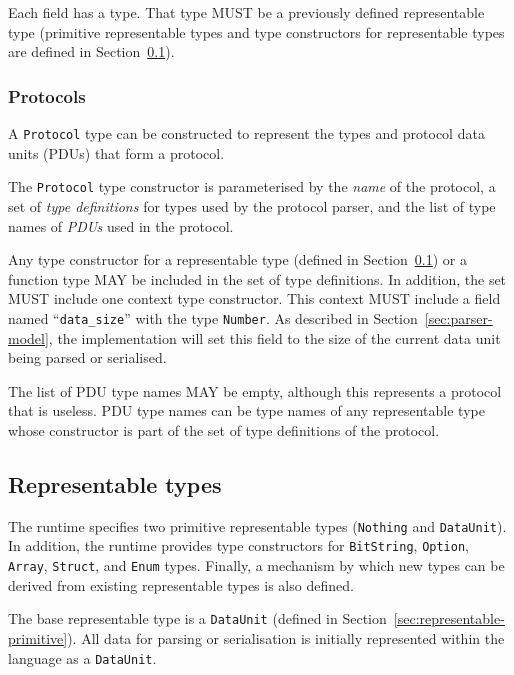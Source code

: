 \documentclass[10pt,twocolumn,a4paper]{article}
\newcommand{\code}[1]{\texttt{#1}}
\begin{document}
Each field has a type. That type MUST be a previously defined representable
type (primitive representable types and type constructors for representable
types are defined in Section~\ref{sec:representable}).

\subsubsection{Protocols}
\label{sec:protocol}

A \code{Protocol} type can be constructed to represent
the types and protocol data units (PDUs) that form a protocol.

The \code{Protocol} type constructor is parameterised by the \emph{name} of the
protocol, a set of \emph{type definitions} for types used by the protocol parser,
and the list of type names of \emph{PDUs} used in the protocol.

Any type constructor for a representable type (defined in
Section~\ref{sec:representable}) or a function type MAY be included in the set
of type definitions. In addition, the set MUST include one context type
constructor. This context MUST include a field named ``\code{data\_size}'' with
the type \code{Number}. As described in Section~\ref{sec:parser-model}, the
implementation will set this field to the size of the current data unit being
parsed or serialised.

The list of PDU type names MAY be empty, although this represents a
protocol that is useless. PDU type names can be type names of any representable
type whose constructor is part of the set of type definitions of the protocol.

\subsection{Representable types}
\label{sec:representable}

The runtime specifies two primitive representable types (\code{Nothing} and
\code{DataUnit}). In addition, the runtime provides type
constructors for \code{BitString}, \code{Option}, \code{Array}, \code{Struct},
and \code{Enum} types. Finally, a mechanism by which new types can be derived
from existing representable types is also defined.

The base representable type is a \code{DataUnit} (defined in
Section~\ref{sec:representable-primitive}). All data for parsing or
serialisation is initially represented within the language as a \code{DataUnit}.
\end{document}

